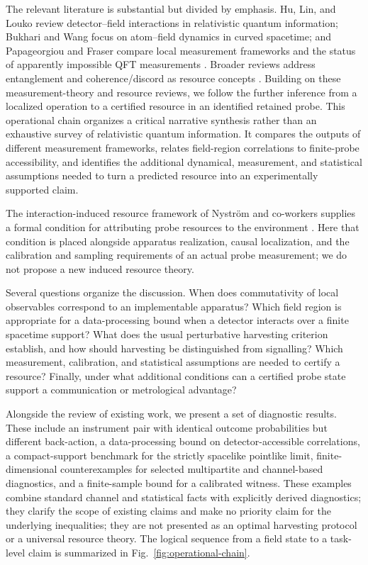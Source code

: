 \documentclass[pdflatex,sn-mathphys-num]{sn-jnl}
\begin{document}
The relevant literature is substantial but divided by emphasis. Hu, Lin, and Louko review detector--field interactions in relativistic quantum information; Bukhari and Wang focus on atom--field dynamics in curved spacetime; and Papageorgiou and Fraser compare local measurement frameworks and the status of apparently impossible QFT measurements \cite{HuLinLouko2012,BukhariWang2024,Papageorgiou2024}. Broader reviews address entanglement and coherence/discord as resource concepts \cite{HorodeckiEtAl2009,Hu2018}. Building on these measurement-theory and resource reviews, we follow the further inference from a localized operation to a certified resource in an identified retained probe. This operational chain organizes a critical narrative synthesis rather than an exhaustive survey of relativistic quantum information. It compares the outputs of different measurement frameworks, relates field-region correlations to finite-probe accessibility, and identifies the additional dynamical, measurement, and statistical assumptions needed to turn a predicted resource into an experimentally supported claim.

The interaction-induced resource framework of Nystr\"om and co-workers supplies a formal condition for attributing probe resources to the environment \cite{Nystrom2026Induced}. Here that condition is placed alongside apparatus realization, causal localization, and the calibration and sampling requirements of an actual probe measurement; we do not propose a new induced resource theory.

Several questions organize the discussion. When does commutativity of local observables correspond to an implementable apparatus? Which field region is appropriate for a data-processing bound when a detector interacts over a finite spacetime support? What does the usual perturbative harvesting criterion establish, and how should harvesting be distinguished from signalling? Which measurement, calibration, and statistical assumptions are needed to certify a resource? Finally, under what additional conditions can a certified probe state support a communication or metrological advantage?

Alongside the review of existing work, we present a set of diagnostic results. These include an instrument pair with identical outcome probabilities but different back-action, a data-processing bound on detector-accessible correlations, a compact-support benchmark for the strictly spacelike pointlike limit, finite-dimensional counterexamples for selected multipartite and channel-based diagnostics, and a finite-sample bound for a calibrated witness. These examples combine standard channel and statistical facts with explicitly derived diagnostics; they clarify the scope of existing claims and make no priority claim for the underlying inequalities; they are not presented as an optimal harvesting protocol or a universal resource theory. The logical sequence from a field state to a task-level claim is summarized in Fig.~\ref{fig:operational-chain}.
\end{document}
